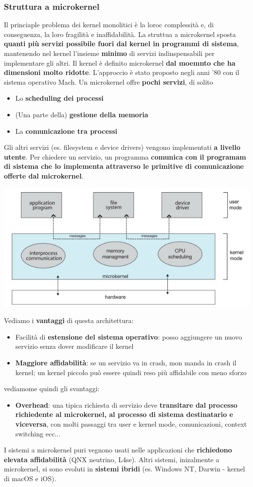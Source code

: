 \documentclass[12pt]{article}
\begin{document}
\subsubsection{Struttura a microkernel}
Il princiaple problema dei kernel monolitici è la loroc complessità e, di conseguenza, la loro fragilità e inaffidabilità.
La struttua a microkernel sposta \textbf{quanti più servizi possibile fuori dal kernel in programmi di sistema}, mantenendo nel kernel l'insieme
\textbf{minimo} di servizi indinspensabili per implementare gli altri.
Il kernel è definito microkernel \textbf{dal moemnto che ha dimensioni molto ridotte}.
L'approccio è stato proposto negli anni '80 con il sistema operativo Mach.
Un microkernel offre \textbf{pochi servizi}, di solito
\begin{itemize}
    \item Lo \textbf{scheduling dei processi}
    \item (Una parte della) \textbf{gestione della memoria}
    \item La \textbf{comunicazione tra processi}
\end{itemize}
Gli altri servizi (es. filesystem e device drivers) vengono implementati \textbf{a livello utente}.
Per chiedere un servizio, un programma \textbf{comunica con il programam di sistema che lo implementa attraverso le primitive di comunicazione offerte dal microkernel}.
\begin{center}
    \includegraphics[width = 0.80\linewidth]{Images/35.png}
\end{center}
Vediamo i \textbf{vantaggi} di questa architettura:
\begin{itemize}
    \item Facilità di \textbf{estensione del sistema operativo}: posso aggiungere un nuovo servizio senza dover modificare il kernel
    \item \textbf{Maggiore affidabilità}: se un servizio va in crash, mon manda in crash il kernel; un kernel piccolo può essere quindi reso più affidabile con meno sforzo
\end{itemize}
vediamome quindi gli svantaggi:
\begin{itemize}
    \item \textbf{Overhead}: una tipica richiesta di servizio deve \textbf{transitare dal processo richiedente al microkernel, al processo di sistema destinatario e viceversa}, con molti passaggi tra user e kernel mode, comunicazioni, context switching ecc...
\end{itemize}
I sistemi a microkernel puri vegnono usati nelle applicazioni che \textbf{richiedono elevata affidabilità} (QNX neutrino, L4se). Altri sistemi, inizalmente a microkernel, si sono evoluti in \textbf{sistemi ibridi} (es. Windows NT, Darwin - kernel di macOS e iOS).
\end{document}
